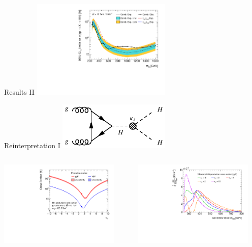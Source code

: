\documentclass[11pt, xcolor={dvipsnames}, aspectratio=169]{beamer}
\begin{document}
\begin{frame}{Results II}
  \includegraphics[width=0.5\textwidth]{results_res/resonant_upper_limits}
\end{frame}


\begin{frame}{Reinterpretation I}
  \includegraphics[width=0.4\textwidth]{feynman_graphs/di_higgs_effective}

  \begin{columns}
    \centering
    \includegraphics[width=0.9\textwidth]{self_coupling/hh_xsec}

    \centering
    \includegraphics[width=0.9\textwidth]{self_coupling/hh_mhh_vs_klam}
  \end{columns}
\end{frame}
\end{document}
